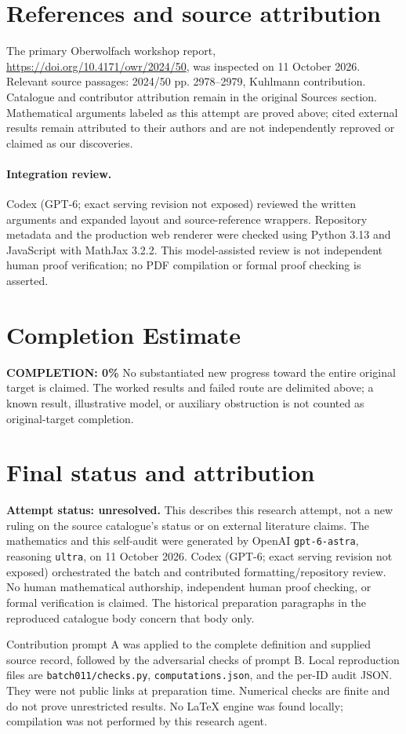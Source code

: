 \documentclass[11pt]{article}
\begin{document}
\section{References and source attribution}
The primary Oberwolfach workshop report, \url{https://doi.org/10.4171/owr/2024/50}, was inspected on 11 October 2026. Relevant source passages: 2024/50 pp. 2978--2979, Kuhlmann contribution. Catalogue and contributor attribution remain in the original Sources section. Mathematical arguments labeled as this attempt are proved above; cited external results remain attributed to their authors and are not independently reproved or claimed as our discoveries.


\paragraph{Integration review.} Codex (GPT-6; exact serving revision not exposed) reviewed the written arguments and expanded layout and source-reference wrappers. Repository metadata and the production web renderer were checked using Python 3.13 and JavaScript with MathJax 3.2.2. This model-assisted review is not independent human proof verification; no PDF compilation or formal proof checking is asserted.

\section{Completion Estimate}
\noindent\textbf{COMPLETION: 0\%}
No substantiated new progress toward the entire original target is claimed. The worked results and failed route are delimited above; a known result, illustrative model, or auxiliary obstruction is not counted as original-target completion.

\section{Final status and attribution}
\textbf{Attempt status: unresolved.} This describes this research attempt, not a new ruling on the source catalogue's status or on external literature claims.
The mathematics and this self-audit were generated by OpenAI \texttt{gpt-6-astra}, reasoning \texttt{ultra}, on 11 October 2026. Codex (GPT-6; exact serving revision not exposed) orchestrated the batch and contributed formatting/repository review. No human mathematical authorship, independent human proof checking, or formal verification is claimed. The historical preparation paragraphs in the reproduced catalogue body concern that body only.

Contribution prompt A was applied to the complete definition and supplied source record, followed by the adversarial checks of prompt B. Local reproduction files are \texttt{batch011/checks.py}, \texttt{computations.json}, and the per-ID audit JSON. They were not public links at preparation time. Numerical checks are finite and do not prove unrestricted results. No LaTeX engine was found locally; compilation was not performed by this research agent.
\end{document}
